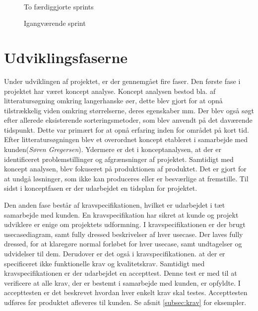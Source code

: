 \begin{figure}[htbp]
\begin{minipage}[b]{0.48\textwidth}
\end{minipage} \\ %
\begin{minipage}[t]{0.48\textwidth}
\caption{To færdiggjorte sprints} %
\label{fig:pt_sprints}
\end{minipage} \hfill
\begin{minipage}[t]{0.48\textwidth}
\caption{Igangværende sprint} %
\label{fig:pt_currentsprint}
\end{minipage}
\end{figure}

\section{Udviklingsfaserne}
Under udviklingen af projektet, er der gennemgået fire faser. Den første fase i projektet har været koncept analyse. Koncept analysen bestod bla. af litteratursøgning omkring langerhanske øer, dette blev gjort for at opnå tilstrækkelig viden omkring størrelserne, deres egenskaber mm. Der blev også søgt efter allerede eksisterende sorteringsmetoder, som blev anvendt på det daværende tidspunkt. Dette var primært for at opnå erfaring inden for området på kort tid. Efter litteratursøgningen blev et overordnet koncept etableret i samarbejde med kunden(\textit{Søren Gregersen}). Ydermere er det i konceptanalysen, at der er identificeret problemstillinger og afgrænsninger af projektet. Samtidigt med koncept analysen, blev fokuseret på produktionen af produktet. Det er gjort for at undgå løsninger, som ikke kan produceres eller er besværlige at fremstille. Til sidst i konceptfasen er der udarbejdet en tidsplan for projektet.

Den anden fase består af kravspecifikationen, hvilket er udarbejdet i tæt samarbejde med kunden. En kravspecifikation har sikret at kunde og projekt udviklere er enige om projektets udformning. I kravspecifikationen er der brugt usecasediagram, samt fully dressed beskrivelser af hver usecase. Der laves fully dressed, for at klaregøre normal forløbet for hver usecase, samt undtagelser og udvidelser til dem. Derudover er det også i kravspecifikationen. at der er specificeret ikke funktionelle krav og kvalitetskrav. Samtidigt med kravspecifikationen er der udarbejdet en accepttest. Denne test er med til at verificere at alle krav, der er bestemt i samarbejde med kunden, er opfyldte. I accepttesten er det beskrevet hvordan hver enkelt krav skal testes. Accepttesten udføres før produktet afleveres til kunden. Se afsnit \ref{subsec:krav} for eksempler.

